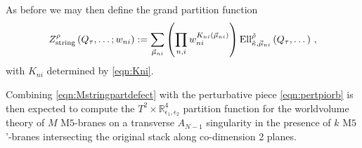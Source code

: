 \documentclass[main.tex]{subfiles}
\begin{document}
As before we may then define the grand partition function
\begin{equation}\label{eqn:Mstringpartdefect}
Z_{\text{string}}^{\rho}\left(Q_{\tau},\dots;w_{ni}\right):=\sum_{\vec{\mu}_{ni}}\left(\prod_{n,i}w_{ni}^{K_{ni}(\vec{\mu}_{ni})}\right)\textrm{Ell}^{\tilde{\rho}}_{\tilde{\kappa},\vec{\mu}_{ni}}\left(Q_{\tau},\dots\right)\,,
\end{equation}
with $K_{ni}$ determined by \eqref{eqn:Kni}. 

Combining \eqref{eqn:Mstringpartdefect} with the perturbative piece \eqref{eqn:pertpiorb} is then expected to compute the $T^2\times \mathbb{R}_{\epsilon_1,\epsilon_2}^4$ partition function for the worldvolume theory of $M$ M$5$-branes on a transverse $A_{N-1}$ singularity in the presence of $k$ M$5$'-branes intersecting the original stack along co-dimension 2 planes.
\end{document}
